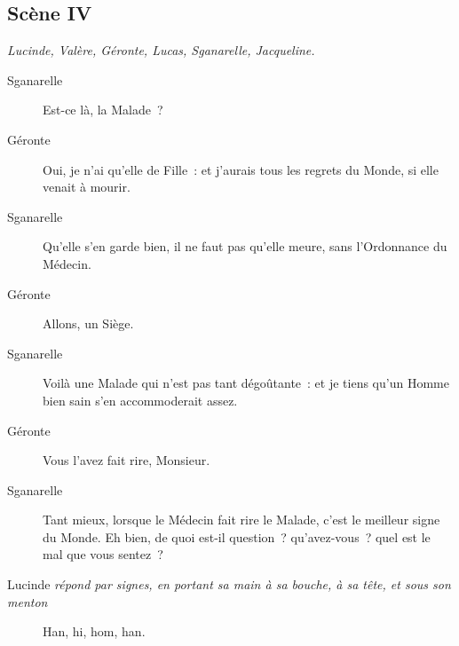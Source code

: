 \documentclass[french,twoside]{book} %
\begin{document}
\subsection[{Scène IV}]{Scène IV}
\label{II04}
\textit{Lucinde, Valère, Géronte, Lucas, Sganarelle, Jacqueline.}\par
 \begin{description} \item[Sganarelle] 

Est-ce là, la Malade ?\end{description}
 \begin{description} \item[Géronte] 

Oui, je n’ai qu’elle de Fille : et j’aurais tous les regrets du Monde, si elle venait à mourir.\end{description}
 \begin{description} \item[Sganarelle] 

Qu’elle s’en garde bien, il ne faut pas qu’elle meure, sans l’Ordonnance du Médecin.\end{description}
 \begin{description} \item[Géronte] 

Allons, un Siège.\end{description}
 \begin{description} \item[Sganarelle] 

Voilà une Malade qui n’est pas tant dégoûtante : et je tiens qu’un Homme bien sain s’en accommoderait assez.\end{description}
 \begin{description} \item[Géronte] 

Vous l’avez fait rire, Monsieur.\end{description}
 \begin{description} \item[Sganarelle] 

Tant mieux, lorsque le Médecin fait rire le Malade, c’est le meilleur signe du Monde. Eh bien, de quoi est-il question ? qu’avez-vous ? quel est le mal que vous sentez ?\end{description}
 \begin{description} \item[Lucinde\textit{ répond par signes, en portant sa main à sa bouche, à sa tête, et sous son menton}\par
] 

Han, hi, hom, han.\end{description}
\end{document}
